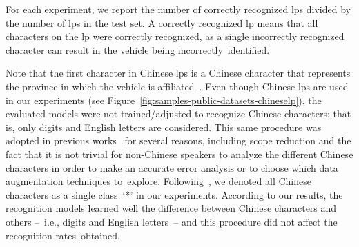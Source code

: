 For each experiment, we report the number of correctly recognized \glspl*{lp} divided by the number of \glspl*{lp} in the test set.
A correctly recognized \gls*{lp} means that all characters on the \gls*{lp} were correctly recognized, as a single incorrectly recognized character can result in the vehicle being incorrectly~identified.

Note that the first character in Chinese \glspl*{lp} is a Chinese character that represents the province in which the vehicle is affiliated~\citep{xu2018towards,zhang2021robust_attentional}.
Even though Chinese \glspl*{lp} are used in our experiments (see Figure~\ref{fig:samples-public-datasets-chineselp}), the evaluated models were not trained/adjusted to recognize Chinese characters; that is, only digits and English letters are considered.
This same procedure was adopted in previous works~\citep{li2019toward,selmi2020delpdar,laroca2021efficient} for several reasons, including scope reduction and the fact that it is not trivial for non-Chinese speakers to analyze the different Chinese characters in order to make an accurate error analysis or to choose which data augmentation techniques to~explore.
Following~\cite{li2019toward}, we denoted all Chinese characters as a single class~`*' in our experiments.
According to our results, the recognition models learned well the difference between Chinese characters and others --~i.e., digits and English letters~-- and this procedure did not affect the recognition rates~obtained.
